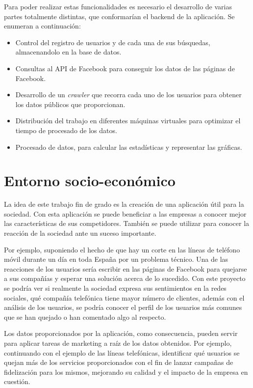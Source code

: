 Para poder realizar estas funcionalidades es necesario el desarrollo de varias partes totalmente distintas, que conformarían el backend de la aplicación. Se enumeran a continuación:
\begin{itemize} \itemsep4pt \parskip0pt
\item Control del registro de usuarios y de cada una de sus búsquedas, almacenandolo en la base de datos.
\item Consultas al API de Facebook para conseguir los datos de las páginas de Facebook.
\item Desarrollo de un \textit{crawler} que recorra cada uno de los usuarios para obtener los datos públicos que proporcionan.
\item Distribución del trabajo en diferentes máquinas virtuales para optimizar el tiempo de procesado de los datos.
\item Procesado de datos, para calcular las estadísticas y representar las gráficas. 
\end{itemize}

\section{Entorno socio-económico}

La idea de este trabajo fin de grado es la creación de una aplicación útil para la sociedad. 
Con esta aplicación se puede beneficiar a las empresas a conocer mejor las características de sus competidores. También se puede utilizar para conocer la reacción de la sociedad ante un suceso importante. 

Por ejemplo, suponiendo el hecho de que hay un corte en las líneas de teléfono móvil durante un día en toda España por un problema técnico. Una de las reacciones de los usuarios sería escribir en las páginas de Facebook para quejarse a sus compañías y esperar una solución acerca de lo sucedido. Con este proyecto se podría ver si realmente la sociedad expresa sus sentimientos en la redes sociales, qué compañía telefónica tiene mayor número de clientes, además con el análisis de los usuarios, se podría conocer el perfil de los usuarios más comunes que se han quejado o han comentado algo al respecto.

Los datos proporcionados por la aplicación, como consecuencia, pueden servir para aplicar tareas de marketing a raíz de los datos obtenidos. Por ejemplo, continuando con el ejemplo de las líneas telefónicas,
identificar qué usuarios se quejan más de los servicios proporcionados con el fin de lanzar campañas de fidelización para los mismos, mejorando su calidad y el impacto de la empresa en cuestión.
 
